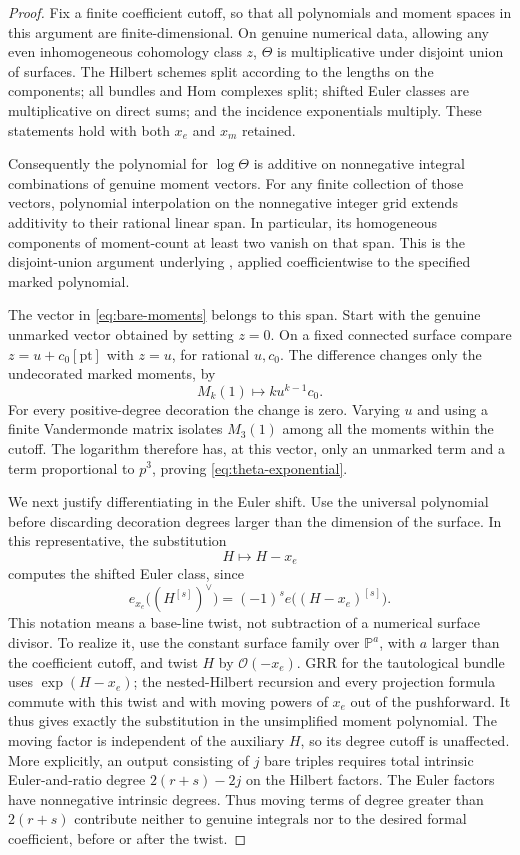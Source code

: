 \begin{proof}
Fix a finite coefficient cutoff, so that all polynomials and moment
spaces in this argument are finite-dimensional. On genuine numerical
data, allowing any even inhomogeneous cohomology class \(z\),
\(\Theta\) is multiplicative under disjoint union of surfaces.
The Hilbert schemes split according to the lengths on the components;
all bundles and Hom complexes split; shifted Euler classes are
multiplicative on direct sums; and the incidence exponentials
multiply. These statements hold with both \(x_e\) and \(x_m\)
retained.

Consequently the polynomial for \(\log\Theta\) is additive on
nonnegative integral combinations of genuine moment vectors.
For any finite collection of those vectors, polynomial interpolation
on the nonnegative integer grid extends additivity to their rational
linear span. In particular, its homogeneous components of
moment-count at least two vanish on that span. This is the
disjoint-union argument underlying \cite[Theorem 4.2]{EGL}, applied
coefficientwise to the specified marked polynomial.

The vector in \eqref{eq:bare-moments} belongs to this span.
Start with the genuine unmarked vector obtained by setting \(z=0\).
On a fixed connected surface compare \(z=u+c_0[\mathrm{pt}]\)
with \(z=u\), for rational \(u,c_0\).
The difference changes only the undecorated marked moments, by
\[
 M_k(1)\longmapsto k u^{k-1}c_0.
\]
For every positive-degree decoration the change is zero.
Varying \(u\) and using a finite Vandermonde matrix isolates
\(M_3(1)\) among all the moments within the cutoff.
The logarithm therefore has, at this vector, only an unmarked term
and a term proportional to \(p^3\), proving
\eqref{eq:theta-exponential}.

We next justify differentiating in the Euler shift.
Use the universal polynomial before discarding decoration degrees
larger than the dimension of the surface. In this representative,
the substitution
\[
 H\longmapsto H-x_e
\]
computes the shifted Euler class, since
\[
 e_{x_e}\bigl((H^{[s]})^\vee\bigr)
 =(-1)^s e\bigl((H-x_e)^{[s]}\bigr).
\]
This notation means a base-line twist, not subtraction of a
numerical surface divisor. To realize it, use the constant surface
family over \(\mathbb P^a\), with \(a\) larger than the coefficient
cutoff, and twist \(H\) by \(\mathcal O(-x_e)\).
GRR for the tautological bundle uses \(\exp(H-x_e)\);
the nested-Hilbert recursion and every projection formula commute
with this twist and with moving powers of \(x_e\) out of the
pushforward. It thus gives exactly the substitution in the
 unsimplified moment polynomial. The moving factor is independent of
 the auxiliary \(H\), so its degree cutoff is unaffected.
 More explicitly, an output consisting of \(j\) bare triples requires
 total intrinsic Euler-and-ratio degree \(2(r+s)-2j\) on the Hilbert
 factors. The Euler factors have nonnegative intrinsic degrees.
 Thus moving terms of degree greater than \(2(r+s)\) contribute
 neither to genuine integrals nor to the desired formal coefficient,
 before or after the twist.


\end{proof}
